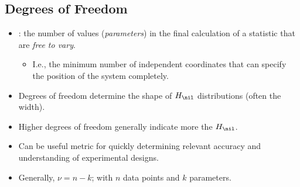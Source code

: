 \begin{itemize}
  \subsection{Degrees of Freedom}
  \begin{itemize}
    \item {}: the number of values (\emph{parameters}) in the final calculation of a statistic that are \emph{free to vary}.
      \begin{itemize}
        \item I.e., the minimum number of independent coordinates that can specify the position of the system completely.
      \end{itemize}
    \item Degrees of freedom determine the shape of \(H_\nil\) distributions (often the width).
    \item Higher degrees of freedom generally indicate more \hyperref[Subsection: Statistical Power]{} the \(H_\nil\).
    \item Can be useful metric for quickly determining relevant accuracy and understanding of experimental designs.
    \item Generally, \emph{\(\nu = n - k\)}; with \(n\) data points and \(k\) parameters.
  \end{itemize}


\end{itemize}
